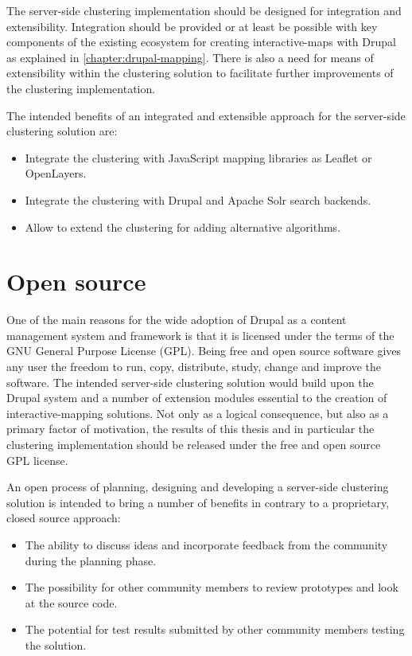 The server-side clustering implementation should be designed for integration and extensibility. Integration should be provided or at least be possible with key components of the existing ecosystem for creating interactive-maps with Drupal as explained in \ref{chapter:drupal-mapping}. There is also a need for means of extensibility within the clustering solution to facilitate further improvements of the clustering implementation.

The intended benefits of an integrated and extensible approach for the server-side clustering solution are:

\begin{itemize}

\item Integrate the clustering with JavaScript mapping libraries as Leaflet or OpenLayers.

\item Integrate the clustering with Drupal and Apache Solr search backends.

\item Allow to extend the clustering for adding alternative algorithms. 

\end{itemize}


\section{Open source}

One of the main reasons for the wide adoption of Drupal as a content management system and framework is that it is licensed under the terms of the GNU General Purpose License (GPL). Being free and open source software gives any user the freedom to run, copy, distribute, study, change and improve the software. The intended server-side clustering solution would build upon the Drupal system and a number of extension modules essential to the creation of interactive-mapping solutions. Not only as a logical consequence, but also as a primary factor of motivation, the results of this thesis and in particular the clustering implementation should be released under the free and open source GPL license.

An open process of planning, designing and developing a server-side clustering solution is intended to bring a number of benefits in contrary to a proprietary, closed source approach:

\begin{itemize}

\item The ability to discuss ideas and incorporate feedback from the community during the planning phase.

\item The possibility for other community members to review prototypes and look at the source code.

\item The potential for test results submitted by other community members testing the solution. 

\end{itemize}



